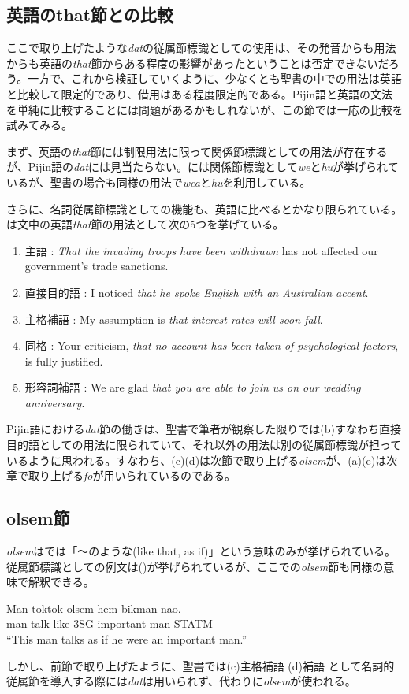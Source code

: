 \subsection{英語のthat節との比較}\label{sec:vsthat}

ここで取り上げたような\textit{dat}の従属節標識としての使用は、その発音からも用法からも英語の\textit{that}節からある程度の影響があったということは否定できないだろう。一方で、これから検証していくように、少なくとも聖書の中での用法は英語と比較して限定的であり、借用はある程度限定的である。Pijin語と英語の文法を単純に比較することには問題があるかもしれないが、この節では一応の比較を試みてみる。

まず、英語の\textit{that}節には制限用法に限って関係節標識としての用法が存在する\cite[365--367]{english}が、Pijin語の\textit{dat}には見当たらない。\cite{dictionary}には関係節標識として\textit{we}と\textit{hu}が挙げられているが、聖書の場合も同様の用法で\textit{wea}と\textit{hu}を利用している。

さらに、名詞従属節標識としての機能も、英語に比べるとかなり限られている。\cite{english}は文中の英語\textit{that}節の用法として次の5つを挙げている。

\begin{enumerate}
  \item 主語 : \textit{That the invading troops have been withdrawn} has not affected our government's trade sanctions.
  \item 直接目的語 : I noticed \textit{that he spoke English with an Australian accent}.
  \item 主格補語 : My assumption is \textit{that interest rates will soon fall}.
  \item 同格 : Your criticism, \textit{that no account has been taken of psychological factors}, is fully justified.
  \item 形容詞補語 : We are glad \textit{that you are able to join us on our wedding anniversary}.
\end{enumerate}

Pijin語における\textit{dat}節の働きは、聖書で筆者が観察した限りでは(b)すなわち直接目的語としての用法に限られていて、それ以外の用法は別の従属節標識が担っているように思われる。すなわち、(c)(d)は次節で取り上げる\textit{olsem}が、(a)(e)は次章で取り上げる\textit{fo}が用いられているのである。

\subsection{olsem節}
\textit{olsem}は\cite{dictionary}では「～のような(like that, as if)」という意味のみが挙げられている。従属節標識としての例文は()が挙げられているが、ここでの\textit{olsem}節も同様の意味で解釈できる。
%
\begin{exe}
  \ex\label{ex:naostatm}
  \gll Man toktok \underline{olsem} hem bikman nao.\\
  man talk \underline{like} 3SG important-man STATM\\
  \glt ``This man talks as if he were an important man.'' \citep[157]{dictionary}
\end{exe}
%
しかし、前節で取り上げたように、聖書では(c)主格補語 (d)補語 として名詞的従属節を導入する際には\textit{dat}は用いられず、代わりに\textit{olsem}が使われる。

